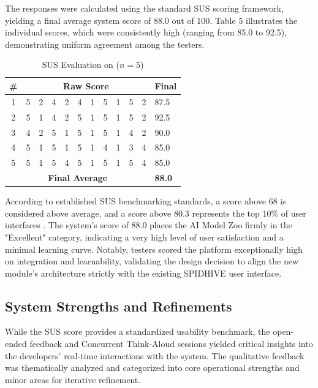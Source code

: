 \documentclass[journal]{./IEEE/IEEEtran}
\begin{document}
The responses were calculated using the standard SUS scoring framework, yielding a final average system score of 88.0 out of 100. Table 5 illustrates the individual scores, which were consistently high (ranging from 85.0 to 92.5), demonstrating uniform agreement among the testers.

\begin{table}[htbp]
    \centering
    \caption{SUS Evaluation on ($n=5$)}
    \begin{tabular*}{\linewidth}{@{\extracolsep{\fill}} cccccccccccl }
    \toprule
    \textbf{\#} & \multicolumn{10}{c}{\textbf{Raw Score}} & \textbf{Final} \\ 
    \midrule
    1 & 5 & 2 & 4 & 2 & 4 & 1 & 5 & 1 & 5 & 2 & 87.5 \\ 
    2 & 5 & 1 & 4 & 2 & 5 & 1 & 5 & 1 & 5 & 2 & 92.5 \\ 
    3 & 4 & 2 & 5 & 1 & 5 & 1 & 5 & 1 & 4 & 2 & 90.0 \\ 
    4 & 5 & 1 & 5 & 1 & 5 & 1 & 4 & 1 & 3 & 4 & 85.0 \\ 
    5 & 5 & 1 & 5 & 4 & 5 & 1 & 5 & 1 & 5 & 4 & 85.0 \\ 
    \midrule
    \multicolumn{11}{c}{\textbf{Final Average}} & \textbf{88.0} \\ 
    \bottomrule
    \end{tabular*}
\end{table}

According to established SUS benchmarking standards, a score above 68 is considered above average, and a score above 80.3 represents the top 10\% of user interfaces \cite{Sauro}. The system’s score of 88.0 places the AI Model Zoo firmly in the "Excellent" category, indicating a very high level of user satisfaction and a minimal learning curve. Notably, testers scored the platform exceptionally high on integration and learnability, validating the design decision to align the new module's architecture strictly with the existing SPIDHIVE user interface.

\subsection{System Strengths and Refinements}
While the SUS score provides a standardized usability benchmark, the open-ended feedback and Concurrent Think-Aloud sessions yielded critical insights into the developers' real-time interactions with the system. The qualitative feedback was thematically analyzed and categorized into core operational strengths and minor areas for iterative refinement.
\end{document}
